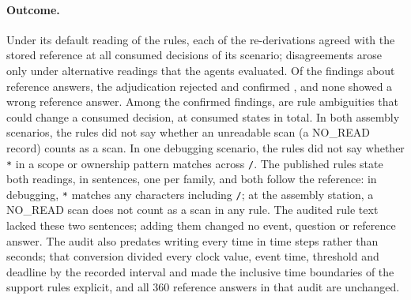 \paragraph{Outcome.}
Under its default reading of the rules, each of the \AuditRederivations{} re-derivations agreed with the stored reference at all \ReleasesPerScenario{} consumed decisions of its scenario; disagreements arose only under alternative readings that the agents evaluated.
Of the \AuditReferenceFindingGroups{} findings about reference answers, the adjudication rejected \AuditReferenceFindingsRejected{} and confirmed \AuditReferenceFindingsConfirmed, and none showed a wrong reference answer.
Among the confirmed findings, \AuditAmbiguitiesWord{} are rule ambiguities that could change a consumed decision, at \AuditAffectedStates{} consumed states in total.
In both assembly scenarios, the rules did not say whether an unreadable scan (a NO\_READ record) counts as a scan.
In one debugging scenario, the rules did not say whether \texttt{*} in a scope or ownership pattern matches across \texttt{/}.
The published rules state both readings, in \AuditClarifiedSentencesWord{} sentences, one per family, and both follow the reference: in debugging, \texttt{*} matches any characters including \texttt{/}; at the assembly station, a NO\_READ scan does not count as a scan in any rule.
The audited rule text lacked these two sentences; adding them changed no event, question or reference answer.
The audit also predates writing every time in time steps rather than seconds; that conversion divided every clock value, event time, threshold and deadline by the recorded interval and made the inclusive time boundaries of the support rules explicit, and all 360 reference answers in that audit are unchanged.


